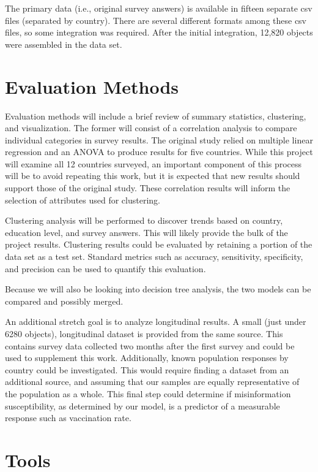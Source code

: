 \documentclass[11pt,sigconf]{acmart}
\begin{document}
The primary data (i.e., original survey answers) is available in fifteen separate csv files (separated by country). There are several different formats among these csv files, so some integration was required. After the initial integration, 12,820 objects were assembled in the data set.

\section{Evaluation Methods}

Evaluation methods will include a brief review of summary statistics, clustering, and visualization. The former will consist of a correlation analysis to compare individual categories in survey results. The original study relied on multiple linear regression and an ANOVA to produce results for five countries. While this project will examine all 12 countries surveyed, an important component of this process will be to avoid repeating this work, but it is expected that new results should support those of the original study. These correlation results will inform the selection of attributes used for clustering.

Clustering analysis will be performed to discover trends based on country, education level, and survey answers. This will likely provide the bulk of the project results. Clustering results could be evaluated by retaining a portion of the data set as a test set. Standard metrics such as accuracy, sensitivity, specificity, and precision can be used to quantify this evaluation.

Because we will also be looking into decision tree analysis, the two models can be compared and possibly merged.

An additional stretch goal is to analyze longitudinal results. A small (just under 6280 objects), longitudinal dataset is provided from the same source. This contains survey data collected two months after the first survey and could be used to supplement this work. Additionally, known population responses by country could be investigated. This would require finding a dataset from an additional source, and assuming that our samples are equally representative of the population as a whole. This final step could determine if misinformation susceptibility, as determined by our model, is a predictor of a measurable response such as vaccination rate.

\section{Tools}
\end{document}
